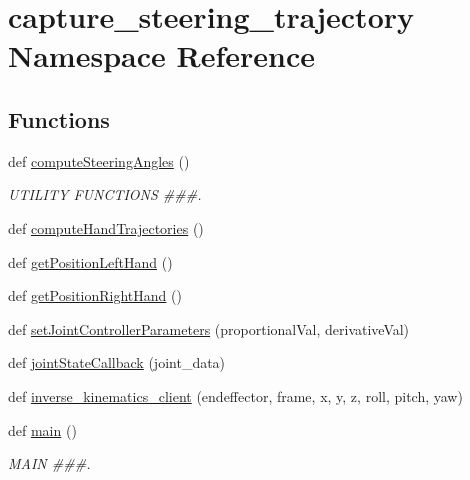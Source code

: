 \hypertarget{namespacecapture__steering__trajectory}{}\section{capture\+\_\+steering\+\_\+trajectory Namespace Reference}
\label{namespacecapture__steering__trajectory}
\subsection*{Functions}
\begin{DoxyCompactItemize}
\item 
def \mbox{\hyperlink{namespacecapture__steering__trajectory_a5c363cf73d43c5a49aefb87f7b46b7b8}{compute\+Steering\+Angles}} ()
\begin{DoxyCompactList}\small\item\em U\+T\+I\+L\+I\+TY F\+U\+N\+C\+T\+I\+O\+NS \#\#\#. \end{DoxyCompactList}\item 
def \mbox{\hyperlink{namespacecapture__steering__trajectory_accdf88c81768a607b05d95a281c536a2}{compute\+Hand\+Trajectories}} ()
\item 
def \mbox{\hyperlink{namespacecapture__steering__trajectory_ad3e684a76f9db3d5dd1280742b90fb6e}{get\+Position\+Left\+Hand}} ()
\item 
def \mbox{\hyperlink{namespacecapture__steering__trajectory_ad0c57e0d1544343dea3bf493566f8482}{get\+Position\+Right\+Hand}} ()
\item 
def \mbox{\hyperlink{namespacecapture__steering__trajectory_a9ee8475f23758be5e441317980db3930}{set\+Joint\+Controller\+Parameters}} (proportional\+Val, derivative\+Val)
\item 
def \mbox{\hyperlink{namespacecapture__steering__trajectory_a09692875ec7c7738291da8fee8480bca}{joint\+State\+Callback}} (joint\+\_\+data)
\item 
def \mbox{\hyperlink{namespacecapture__steering__trajectory_acc20e7be007d128cc6c9f6a2a32b6c0f}{inverse\+\_\+kinematics\+\_\+client}} (endeffector, frame, x, y, z, roll, pitch, yaw)
\item 
def \mbox{\hyperlink{namespacecapture__steering__trajectory_a2c7ff1a36c7fbaa2dda08f4b07e2c0fd}{main}} ()
\begin{DoxyCompactList}\small\item\em M\+A\+IN \#\#\#. \end{DoxyCompactList}\end{DoxyCompactItemize}
